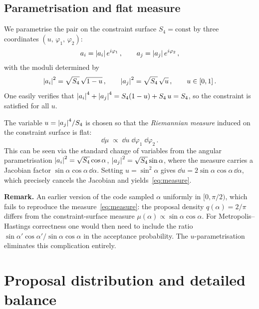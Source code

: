 \documentclass[11pt,a4paper]{article}
\newcommand{\Sfour}{S_4}
\begin{document}
\subsection{Parametrisation and flat measure}\label{sec:param}

We parametrise the pair on the constraint surface $\Sfour = \mathrm{const}$
by three coordinates $(u,\,\varphi_1,\,\varphi_2)$:
\begin{equation}\label{eq:param}
  a_i = \abs{a_i}\, e^{i\varphi_1}\,,\qquad
  a_j = \abs{a_j}\, e^{i\varphi_2}\,,
\end{equation}
with the moduli determined by
\begin{equation}\label{eq:moduli}
  \abs{a_i}^2 = \sqrt{\Sfour}\,\sqrt{1-u}\,,\qquad
  \abs{a_j}^2 = \sqrt{\Sfour}\,\sqrt{u}\,,\qquad
  u\in[0,1]\,.
\end{equation}
One easily verifies that
$\abs{a_i}^4 + \abs{a_j}^4 = \Sfour(1-u) + \Sfour\, u = \Sfour$, so the
constraint is satisfied for all $u$.

The variable $u = \abs{a_j}^4/\Sfour$ is chosen so that the
\emph{Riemannian measure} induced on the constraint surface is flat:
\begin{equation}\label{eq:measure}
  \dd\mu \;\propto\; \dd u\;\dd\varphi_1\;\dd\varphi_2 \,.
\end{equation}
This can be seen via the standard change of variables from the angular
parametrisation $\abs{a_i}^2 = \sqrt{\Sfour}\cos\alpha$,
$\abs{a_j}^2 = \sqrt{\Sfour}\sin\alpha$, where the measure carries a
Jacobian factor $\sin\alpha\cos\alpha\,\dd\alpha$.  Setting
$u = \sin^2\!\alpha$ gives $\dd u = 2\sin\alpha\cos\alpha\,\dd\alpha$, which
precisely cancels the Jacobian and yields~\eqref{eq:measure}.

\medskip\noindent\textbf{Remark.}
An earlier version of the code sampled $\alpha$ uniformly in $[0,\pi/2)$,
which fails to reproduce the measure~\eqref{eq:measure}: the proposal
density $q(\alpha) = 2/\pi$ differs from the constraint-surface measure
$\mu(\alpha)\propto\sin\alpha\cos\alpha$.  For Metropolis--Hastings
correctness one would then need to include the ratio
$\sin\alpha'\cos\alpha'\!/\!\sin\alpha\cos\alpha$ in the acceptance
probability.  The $u$-parametrisation eliminates this complication entirely.

\section{Proposal distribution and detailed balance}
\end{document}
